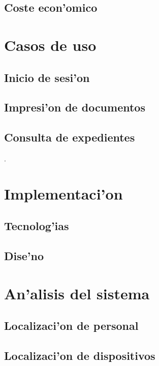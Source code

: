 \documentclass[a4paper]{article}
\begin{document}
\begin{large}
	\subsection{Coste econ'omico}
		

\newpage

 \section{Casos de uso}

	\subsection{Inicio de sesi'on}
		

	\subsection{Impresi'on de documentos}
		

	\subsection{Consulta de expedientes}
				
\newpage 
.
\newpage

\section{Implementaci'on}

	\subsection{Tecnolog'ias}
				

	\subsection{Dise'no}
		

\newpage

\section{An'alisis del sistema}

	\subsection{Localizaci'on de personal}
		

	\subsection{Localizaci'on de dispositivos}
		


\end{large}
\end{document}
